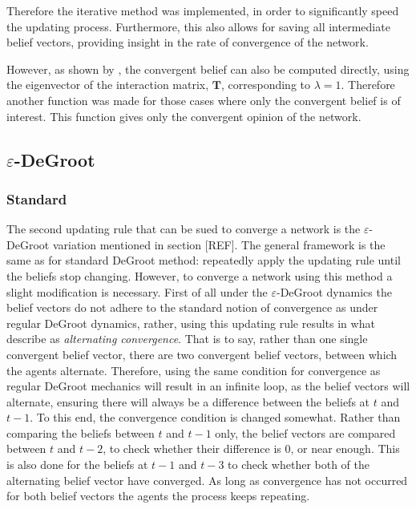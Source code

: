 \documentclass{article}
\newcommand{\T}{\textbf{T}}
\begin{document}
Therefore the iterative method was implemented, in order to significantly speed the updating process. Furthermore, this also allows for saving all intermediate belief vectors, providing insight in the rate of convergence of the network.

However, as shown by \cite{degroot1974concensus}, the convergent belief can also be computed directly, using the eigenvector of the interaction matrix, $\T$, corresponding to $\lambda=1$. Therefore another function was made for those cases where only the convergent belief is of interest. This function gives only the convergent opinion of the network.

\subsection{$\varepsilon$-DeGroot}
\subsubsection{Standard}

The second updating rule that can be sued to converge a network is the $\varepsilon$-DeGroot variation mentioned in section [REF]. The general framework is the same as for standard DeGroot method: repeatedly apply the updating rule until the beliefs stop changing. However, to converge a network using this method a slight modification is necessary. First of all under the $\varepsilon$-DeGroot dynamics the belief vectors do not adhere to the standard notion of convergence as under regular DeGroot dynamics, rather, using this updating rule results in what \cite{amir2021robust} describe as \textit{alternating convergence}. That is to say, rather than one single convergent belief vector, there are two convergent belief vectors, between which the agents alternate.
Therefore, using the same condition for convergence as regular DeGroot mechanics will result in an infinite loop, as the belief vectors will alternate, ensuring there will always be a difference between the beliefs at $t$ and $t-1$. To this end, the convergence condition is changed somewhat. Rather than comparing the beliefs between $t$ and $t-1$ only, the belief vectors are compared between $t$ and $t-2$, to check whether their difference is 0, or near enough. This is also done for the beliefs at $t-1$ and $t-3$ to check whether both of the alternating belief vector have converged. As long as convergence has not occurred for both belief vectors the agents the process keeps repeating.
\end{document}
